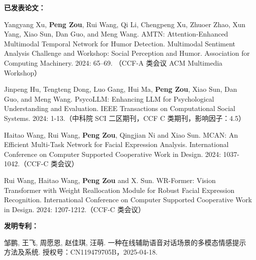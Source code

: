 
\begin{achievements}

\textbf{已发表论文：}
\begin{enumerate}[label=\text{[\arabic*]}] %
  \item Yangyang Xu, \textbf{Peng Zou}, Rui Wang, Qi Li, Chengpeng Xu, Zhuoer Zhao, Xun Yang, Xiao Sun, Dan Guo, and Meng Wang. AMTN: Attention-Enhanced Multimodal Temporal Network for Humor Detection. Multimodal Sentiment Analysis Challenge and Workshop: Social Perception and Humor. Association for Computing Machinery. 2024: 65–69. （CCF-A 类会议 ACM Multimedia Workshop）

  \item Jinpeng Hu, Tengteng Dong, Luo Gang, Hui Ma, \textbf{Peng Zou}, Xiao Sun, Dan Guo, and Meng Wang. PsycoLLM: Enhancing LLM for Psychological Understanding and Evaluation. IEEE Transactions on Computational Social Systems. 2024: 1-13.（中科院 SCI 二区期刊，CCF C 类期刊，影响因子：4.5）

  \item Haitao Wang, Rui Wang, \textbf{Peng Zou}, Qingjian Ni and Xiao Sun. MCAN: An Efficient Multi-Task Network for Facial Expression Analysis. International Conference on Computer Supported Cooperative Work in Design. 2024: 1037-1042.（CCF-C 类会议）

  \item Rui Wang, Haitao Wang, \textbf{Peng Zou} and X. Sun. WR-Former: Vision Transformer with Weight Reallocation Module for Robust Facial Expression Recognition. International Conference on Computer Supported Cooperative Work in Design. 2024: 1207-1212.（CCF-C 类会议）

\end{enumerate}

\textbf{发明专利：}
\begin{enumerate}[label=\text{[\arabic*]}] %
  \item 邹鹏, 王飞, 周愿恩, 赵佳琪, 汪萌. 一种在线辅助语音对话场景的多模态情感提示方法及系统. 授权号：CN119479705B，2025-04-18.

\end{enumerate}



\end{achievements}
